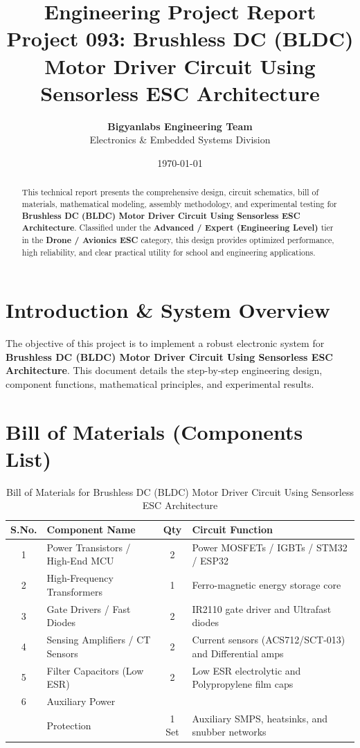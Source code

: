 \documentclass[11pt,a4paper]{article}
\title{\textbf{\Huge Engineering Project Report}\\[0.5em] \Large Project 093: Brushless DC (BLDC) Motor Driver Circuit Using Sensorless ESC Architecture}
\author{\textbf{Bigyanlabs Engineering Team}\\ Electronics \& Embedded Systems Division}
\date{\today}
\begin{document}
\maketitle
\thispagestyle{empty}

\begin{abstract}
This technical report presents the comprehensive design, circuit schematics, bill of materials, mathematical modeling, assembly methodology, and experimental testing for \textbf{Brushless DC (BLDC) Motor Driver Circuit Using Sensorless ESC Architecture}. Classified under the \textbf{Advanced / Expert (Engineering Level)} tier in the \textbf{Drone / Avionics ESC} category, this design provides optimized performance, high reliability, and clear practical utility for school and engineering applications.
\end{abstract}

\newpage
\tableofcontents
\newpage

\section{Introduction \& System Overview}
The objective of this project is to implement a robust electronic system for \textbf{Brushless DC (BLDC) Motor Driver Circuit Using Sensorless ESC Architecture}. This document details the step-by-step engineering design, component functions, mathematical principles, and experimental results.

\section{Bill of Materials (Components List)}
\begin{table}[h!]
\centering
\caption{Bill of Materials for Brushless DC (BLDC) Motor Driver Circuit Using Sensorless ESC Architecture}
\vspace{0.5em}
\begin{tabular}{clcp{7cm}}
\toprule
\textbf{S.No.} & \textbf{Component Name} & \textbf{Qty} & \textbf{Circuit Function} \\
\midrule
1 & Power Transistors / High-End MCU & 2 & Power MOSFETs / IGBTs / STM32 / ESP32 \\
2 & High-Frequency Transformers & 1 & Ferro-magnetic energy storage core \\
3 & Gate Drivers / Fast Diodes & 2 & IR2110 gate driver and Ultrafast diodes \\
4 & Sensing Amplifiers / CT Sensors & 2 & Current sensors (ACS712/SCT-013) and Differential amps \\
5 & Filter Capacitors (Low ESR) & 2 & Low ESR electrolytic and Polypropylene film caps \\
6 & Auxiliary Power \\& Protection & 1 Set & Auxiliary SMPS, heatsinks, and snubber networks \\
\bottomrule
\end{tabular}
\end{table}
\end{document}
